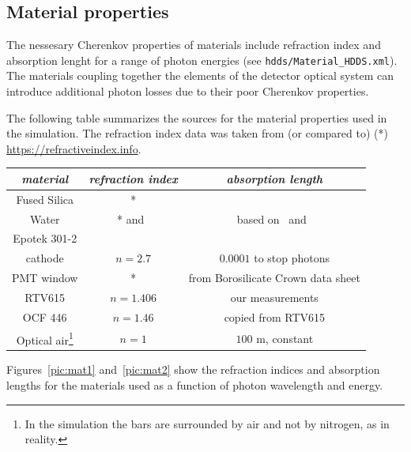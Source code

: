 \subsection{Material properties}

The nessesary Cherenkov properties of materials include refraction index and absorption lenght for a range of photon energies (see \texttt{hdds/Material{\_}HDDS.xml}). The materials coupling together the elements of the detector optical system can introduce additional photon losses due to their poor Cherenkov properties. 

The following table summarizes the sources for the material properties used in the simulation. The refraction index data was taken from (or compared to) (*) \\ \url{https://refractiveindex.info}. 

\vspace{0.5cm}
\begin{tabular}{| c | c | c |}
\hline
\textit{material} & \textit{refraction index} & \textit{absorption length} \\
\hline
Fused Silica & * & \cite{Epotek} \\
\hline
Water & * and~\cite{EpotekData} & based on~\cite{water} and~\cite{water2} \\
\hline
Epotek 301-2 & \cite{EpotekData} & \cite{Epotek} \\
\hline
cathode & $n = 2.7$ & $0.0001$ to stop photons \\
\hline
PMT window & * &  from Borosilicate Crown data sheet \\
\hline
RTV615 & $n = 1.406$ & our measurements \\
\hline
OCF 446 & $n = 1.46$ & copied from RTV615 \\
\hline
Optical air\footnote{In the simulation the bars are surrounded by air and not by nitrogen, as in reality.} & $n = 1$ & $100$ m, constant \\
\hline
\end{tabular}
\vspace{0.5cm}

Figures~\ref{pic:mat1} and~\ref{pic:mat2} show the refraction indices and absorption lengths for the materials used as a function of photon wavelength and energy.

